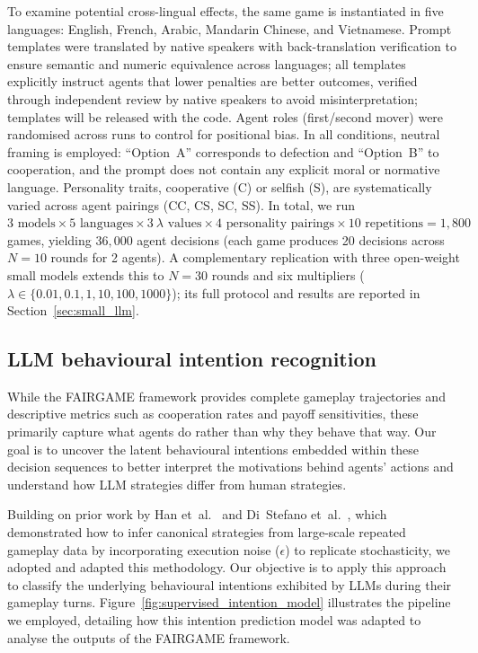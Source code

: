 \documentclass[a4paper,fleqn]{cas-sc}
\begin{document}
To examine potential cross-lingual effects, the same game is instantiated in five languages: English, French, Arabic, Mandarin Chinese, and Vietnamese. Prompt templates were translated by native speakers with back-translation verification to ensure semantic and numeric equivalence across languages; all templates explicitly instruct agents that lower penalties are better outcomes, verified through independent review by native speakers to avoid misinterpretation; templates will be released with the code. Agent roles (first/second mover) were randomised across runs to control for positional bias. In all conditions, neutral framing is employed: ``Option~A'' corresponds to defection and ``Option~B'' to cooperation, and the prompt does not contain any explicit moral or normative language. Personality traits, cooperative (C) or selfish (S), are systematically varied across agent pairings (CC, CS, SC, SS). In total, we run $3 \text{ models} \times 5 \text{ languages} \times 3~\lambda \text{ values} \times 4 \text{ personality pairings} \times 10 \text{ repetitions} = 1{,}800$ games, yielding $36{,}000$ agent decisions (each game produces 20 decisions across $N{=}10$ rounds for 2 agents). A complementary replication with three open-weight small models extends this to $N{=}30$ rounds and six multipliers ($\lambda \in \{0.01, 0.1, 1, 10, 100, 1000\}$); its full protocol and results are reported in Section~\ref{sec:small_llm}.

\subsection{LLM behavioural intention recognition}\label{subsec:intention_recognition}

While the FAIRGAME framework provides complete gameplay trajectories and descriptive metrics such as cooperation rates and payoff sensitivities, these primarily capture what agents do rather than why they behave that way. Our goal is to uncover the latent behavioural intentions embedded within these decision sequences to better interpret the motivations behind agents' actions and understand how LLM strategies differ from human strategies.

Building on prior work by Han et~al.~\cite{Han2012ALIFEjournal,han2011role} and Di~Stefano et~al.~\cite{diStefanoIntention2023}, which demonstrated how to infer canonical strategies from large-scale repeated gameplay data by incorporating execution noise ($\epsilon$) to replicate stochasticity, we adopted and adapted this methodology. Our objective is to apply this approach to classify the underlying behavioural intentions exhibited by LLMs during their gameplay turns. Figure~\ref{fig:supervised_intention_model} illustrates the pipeline we employed, detailing how this intention prediction model was adapted to analyse the outputs of the FAIRGAME framework.
\end{document}
